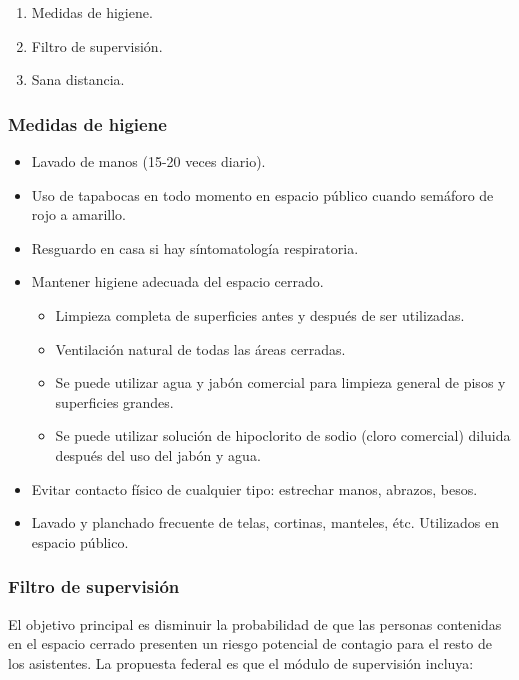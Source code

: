 \documentclass[]{article}
\providecommand{\tightlist}{%
  \setlength{\itemsep}{0pt}\setlength{\parskip}{0pt}}
\begin{document}
\begin{enumerate}
\def\labelenumi{\arabic{enumi}.}
\tightlist
\item
  Medidas de higiene.
\item
  Filtro de supervisión.
\item
  Sana distancia.
\end{enumerate}

\subsubsection{Medidas de higiene}\label{medidas-de-higiene}

\begin{itemize}
\tightlist
\item
  Lavado de manos (15-20 veces diario).
\item
  Uso de tapabocas en todo momento en espacio público cuando semáforo de
  rojo a amarillo.
\item
  Resguardo en casa si hay síntomatología respiratoria.
\item
  Mantener higiene adecuada del espacio cerrado.

  \begin{itemize}
  \tightlist
  \item
    Limpieza completa de superficies antes y después de ser utilizadas.
  \item
    Ventilación natural de todas las áreas cerradas.
  \item
    Se puede utilizar agua y jabón comercial para limpieza general de
    pisos y superficies grandes.
  \item
    Se puede utilizar solución de hipoclorito de sodio (cloro comercial)
    diluida después del uso del jabón y agua.
  \end{itemize}
\item
  Evitar contacto físico de cualquier tipo: estrechar manos, abrazos,
  besos.
\item
  Lavado y planchado frecuente de telas, cortinas, manteles, étc.
  Utilizados en espacio público.
\end{itemize}

\subsubsection{Filtro de supervisión}\label{filtro-de-supervisiuxf3n}

El objetivo principal es disminuir la probabilidad de que las personas
contenidas en el espacio cerrado presenten un riesgo potencial de
contagio para el resto de los asistentes. La propuesta federal es que el
módulo de supervisión incluya:
\end{document}
